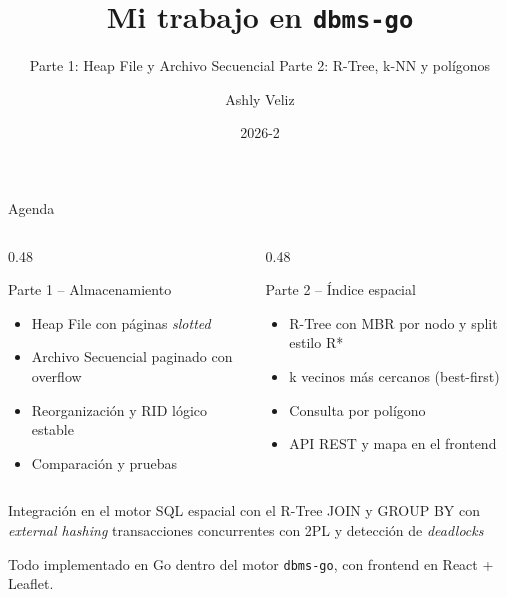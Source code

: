 \documentclass[aspectratio=169,10pt]{beamer}
\title{Mi trabajo en \texttt{dbms-go}}
\subtitle{Parte 1: Heap File y Archivo Secuencial \;\textbullet\; Parte 2: R-Tree, k-NN y polígonos}
\author{Ashly Veliz}
\institute{Base de Datos 2 \;--\; UTEC}
\date{2026-2}
\begin{document}
\begin{frame}
  \titlepage
\end{frame}

\begin{frame}{Agenda}
  \begin{columns}[T]
    \begin{column}{0.48\textwidth}
      \begin{block}{Parte 1 \;--\; Almacenamiento}
        \begin{itemize}
          \item Heap File con páginas \emph{slotted}
          \item Archivo Secuencial paginado con overflow
          \item Reorganización y RID lógico estable
          \item Comparación y pruebas
        \end{itemize}
      \end{block}
    \end{column}
    \begin{column}{0.48\textwidth}
      \begin{block}{Parte 2 \;--\; Índice espacial}
        \begin{itemize}
          \item R-Tree con MBR por nodo y split estilo R*
          \item k vecinos más cercanos (best-first)
          \item Consulta por polígono
          \item API REST y mapa en el frontend
        \end{itemize}
      \end{block}
    \end{column}
  \end{columns}
  \vspace{0.6em}
  \begin{block}{Integración en el motor}
    \small SQL espacial con el R-Tree \;\textbullet\; JOIN y GROUP BY con \emph{external hashing} \;\textbullet\; transacciones concurrentes con 2PL y detección de \emph{deadlocks}
  \end{block}
  \centering
  {\small\color{gris}Todo implementado en Go dentro del motor \texttt{dbms-go}, con frontend en React + Leaflet.}
\end{frame}
\end{document}
